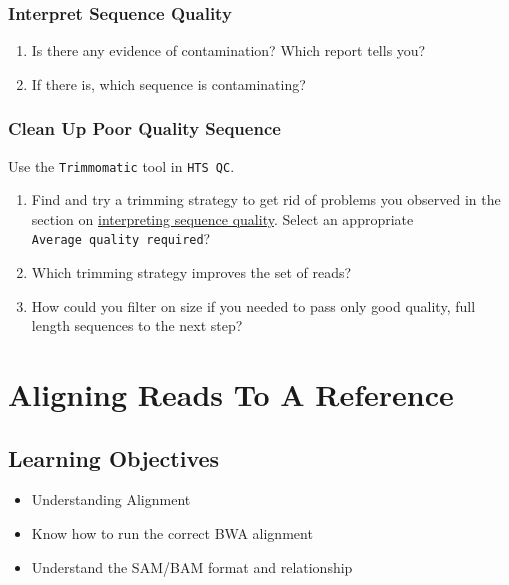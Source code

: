 \documentclass[12pt,]{book}
\providecommand{\tightlist}{%
  \setlength{\itemsep}{0pt}\setlength{\parskip}{0pt}}
\theoremstyle{definition}
\theoremstyle{definition}
\theoremstyle{remark}
\begin{document}
\hypertarget{qualprac}{\subsection{Interpret Sequence
Quality}\label{qualprac}}

\begin{enumerate}
\def\labelenumi{\arabic{enumi}.}
\tightlist
\item
  Is there any evidence of contamination? Which report tells you?
\item
  If there is, which sequence is contaminating?
\end{enumerate}

\subsection{Clean Up Poor Quality
Sequence}\label{clean-up-poor-quality-sequence}

Use the \texttt{Trimmomatic} tool in \texttt{HTS\ QC}.

\begin{enumerate}
\def\labelenumi{\arabic{enumi}.}
\tightlist
\item
  Find and try a trimming strategy to get rid of problems you observed
  in the section on \protect\hyperlink{qualprac}{interpreting sequence
  quality}. Select an appropriate \texttt{Average\ quality\ required}?
\item
  Which trimming strategy improves the set of reads?
\item
  How could you filter on size if you needed to pass only good quality,
  full length sequences to the next step?
\end{enumerate}

\chapter{Aligning Reads To A
Reference}\label{aligning-reads-to-a-reference}

\section{Learning Objectives}\label{learning-objectives-2}

\begin{itemize}
\tightlist
\item
  Understanding Alignment
\item
  Know how to run the correct BWA alignment
\item
  Understand the SAM/BAM format and relationship
\end{itemize}
\end{document}
